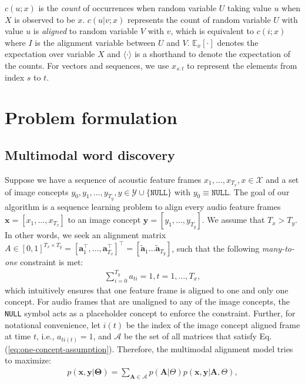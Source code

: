 \documentclass[journal]{IEEEtran}
\begin{document}
$c(u; x)$ is the \textit{count} of occurrences when random variable $U$ taking value $u$ when $X$ is observed to be $x$. $c(u|v; x)$ represents the count of random variable $U$ with value $u$ is \textit{aligned} to random variable $V$ with $v$, which is equivalent to $c(i; x)$ where $I$ is the alignment variable between $U$ and $V$. $\mathbb E_x[\cdot]$ denotes the expectation over variable $X$ and $\langle \cdot \rangle$ is a shorthand to denote the expectation of the counts. For vectors and sequences, we use $x_{s:t}$ to represent the elements from index $s$ to $t$. 

\section{Problem formulation}
\subsection{Multimodal word discovery}
Suppose we have a sequence of acoustic feature frames $x_1, \ldots, x_{T_x}, x \in \mathcal X$ and a set of image concepts $y_0, y_1, \ldots, y_{T_y}, y \in \mathcal Y \cup \{\texttt{NULL}\}$ with $y_0 \equiv \texttt{NULL}$. The goal of our algorithm is a sequence learning problem to align every audio feature frames $\mathbf x = [x_1, \ldots, x_{T_x}]$ to an image concept $\mathbf y = [y_1, \ldots, y_{T_y}]$.  We assume that $T_x > T_y$. In other words, we seek an alignment matrix $A \in [0, 1]^{T_x \times T_y}=[\mathbf a_1^\top, \ldots, \mathbf a_{T_x}^{\top}]^{\top} = [\tilde{\mathbf a}_1 \ldots \tilde{\mathbf a}_{T_y}]$, such that the following \textit{many-to-one} constraint is met:
\begin{align}\label{eq:one-concept-assumption}
    \sum_{i=0}^{T_y} a_{ti} = 1, t = 1, \ldots, T_x,
\end{align}
which intuitively ensures that one feature frame is aligned to one and only one concept. For audio frames that are unaligned to any of the image concepts, the \texttt{NULL} symbol acts as a placeholder concept to enforce the constraint. Further, for notational convenience, let $i(t)$ be the index of the image concept aligned frame at time $t$, i.e., $a_{ti(t)} = 1$, and $\mathcal A$ be the set of all matrices that satisfy Eq. (\ref{eq:one-concept-assumption}). Therefore, the multimodal alignment model tries to maximize:
\begin{align}\label{eq:general_trans_prob}
    p(\mathbf{x},\mathbf{y}|\mathbf \Theta) = \sum_{\mathbf{A}\in \mathcal A} p(\mathbf{A}|\Theta) p(\mathbf{x}, \mathbf{y}|\mathbf{A}, \Theta),
\end{align}
\end{document}
